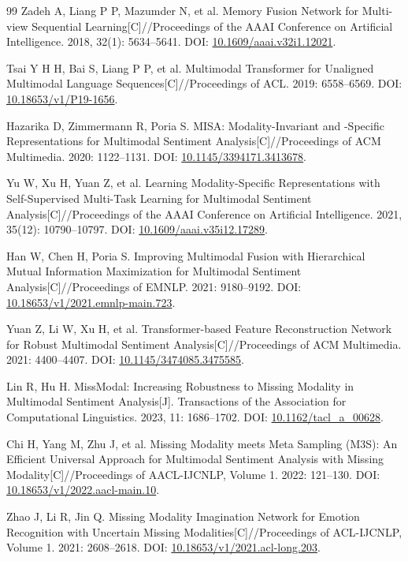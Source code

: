 {\begin{thebibliography}{99}
 Zadeh A, Liang P P, Mazumder N, et al. Memory Fusion Network for Multi-view Sequential Learning[C]//Proceedings of the AAAI Conference on Artificial Intelligence. 2018, 32(1): 5634--5641. DOI: \url{10.1609/aaai.v32i1.12021}.

 Tsai Y H H, Bai S, Liang P P, et al. Multimodal Transformer for Unaligned Multimodal Language Sequences[C]//Proceedings of ACL. 2019: 6558--6569. DOI: \url{10.18653/v1/P19-1656}.

 Hazarika D, Zimmermann R, Poria S. MISA: Modality-Invariant and -Specific Representations for Multimodal Sentiment Analysis[C]//Proceedings of ACM Multimedia. 2020: 1122--1131. DOI: \url{10.1145/3394171.3413678}.

 Yu W, Xu H, Yuan Z, et al. Learning Modality-Specific Representations with Self-Supervised Multi-Task Learning for Multimodal Sentiment Analysis[C]//Proceedings of the AAAI Conference on Artificial Intelligence. 2021, 35(12): 10790--10797. DOI: \url{10.1609/aaai.v35i12.17289}.

 Han W, Chen H, Poria S. Improving Multimodal Fusion with Hierarchical Mutual Information Maximization for Multimodal Sentiment Analysis[C]//Proceedings of EMNLP. 2021: 9180--9192. DOI: \url{10.18653/v1/2021.emnlp-main.723}.

 Yuan Z, Li W, Xu H, et al. Transformer-based Feature Reconstruction Network for Robust Multimodal Sentiment Analysis[C]//Proceedings of ACM Multimedia. 2021: 4400--4407. DOI: \url{10.1145/3474085.3475585}.

 Lin R, Hu H. MissModal: Increasing Robustness to Missing Modality in Multimodal Sentiment Analysis[J]. Transactions of the Association for Computational Linguistics. 2023, 11: 1686--1702. DOI: \url{10.1162/tacl_a_00628}.

 Chi H, Yang M, Zhu J, et al. Missing Modality meets Meta Sampling (M3S): An Efficient Universal Approach for Multimodal Sentiment Analysis with Missing Modality[C]//Proceedings of AACL-IJCNLP, Volume 1. 2022: 121--130. DOI: \url{10.18653/v1/2022.aacl-main.10}.

 Zhao J, Li R, Jin Q. Missing Modality Imagination Network for Emotion Recognition with Uncertain Missing Modalities[C]//Proceedings of ACL-IJCNLP, Volume 1. 2021: 2608--2618. DOI: \url{10.18653/v1/2021.acl-long.203}.

\end{thebibliography}
}
